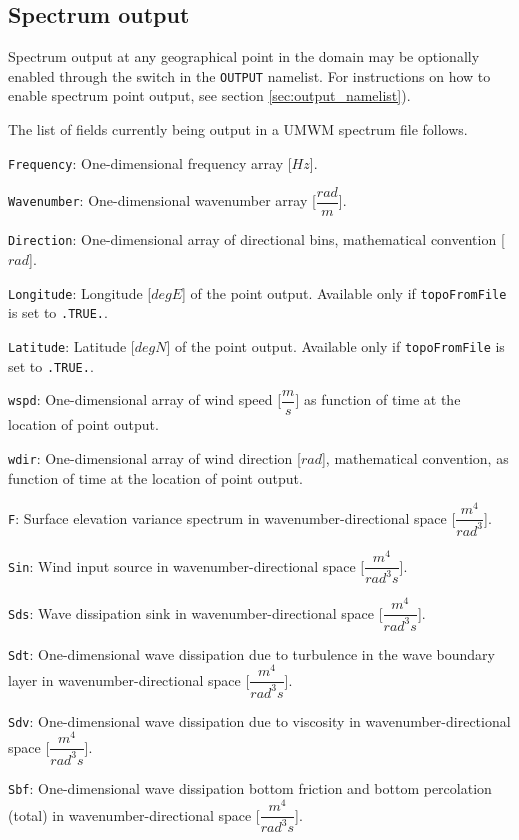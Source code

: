\documentclass[letterpaper]{article}
\numberwithin{equation}{section}
\begin{document}
\subsection{Spectrum output}

Spectrum output at any geographical point in the domain may be optionally enabled
through the switch in the \verb+OUTPUT+ namelist.
For instructions on how to enable spectrum point output, 
see section \ref{sec:output_namelist}). 

The list of fields currently being output in a UMWM spectrum file follows.

\verb+Frequency+:
One-dimensional frequency array [$Hz$].

\verb+Wavenumber+:
One-dimensional wavenumber array [$\dfrac{rad}{m}$].

\verb+Direction+:
One-dimensional array of directional bins, mathematical convention [$rad$].

\verb+Longitude+:
Longitude [$deg E$] of the point output. 
Available only if \verb+topoFromFile+ is set to \verb+.TRUE.+.

\verb+Latitude+:
Latitude [$deg N$] of the point output. 
Available only if \verb+topoFromFile+ is set to \verb+.TRUE.+.

\verb+wspd+:
One-dimensional array of wind speed [$\dfrac{m}{s}$] as function of time
at the location of point output.

\verb+wdir+:
One-dimensional array of wind direction [$rad$], mathematical convention, 
as function of time at the location of point output.

\verb+F+:
Surface elevation variance spectrum in wavenumber-directional space [$\dfrac{m^{4}}{rad^{3}}$].

\verb+Sin+:
Wind input source in wavenumber-directional space [$\dfrac{m^{4}}{rad^{3}s}$].

\verb+Sds+:
Wave dissipation sink in wavenumber-directional space [$\dfrac{m^{4}}{rad^{3}s}$].

\verb+Sdt+:
One-dimensional wave dissipation due to turbulence 
in the wave boundary layer in wavenumber-directional space [$\dfrac{m^{4}}{rad^{3}s}$].

\verb+Sdv+:
One-dimensional wave dissipation due to viscosity 
in wavenumber-directional space [$\dfrac{m^{4}}{rad^{3}s}$].

\verb+Sbf+:
One-dimensional wave dissipation bottom friction and bottom percolation (total)
in wavenumber-directional space [$\dfrac{m^{4}}{rad^{3}s}$].
\end{document}
